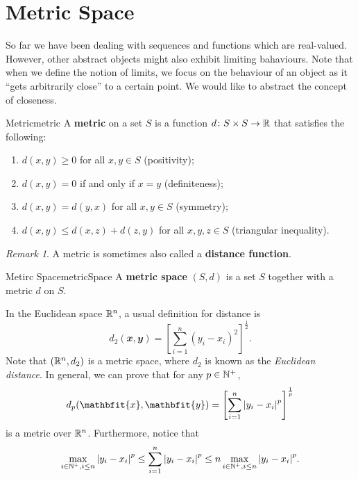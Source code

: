 \documentclass[math]{amznotes}
\theoremstyle{remark}
\newtheorem*{remark}{Remark}
\begin{document}
\section{Metric Space}
So far we have been dealing with sequences and functions which are real-valued. However, other abstract objects might also exhibit limiting bahaviours. Note that when we define the notion of limits, we focus on the behaviour of an object as it ``gets arbitrarily close'' to a certain point. We would like to abstract the concept of closeness.
\begin{dfnbox}{Metric}{metric}
    A {\color{red} \textbf{metric}} on a set $S$ is a function $d \colon S \times S \to \mathbb{R}$ that satisfies the following:
    \begin{enumerate}
        \item $d(x, y) \geq 0$ for all $x, y \in S$ (positivity);
        \item $d(x, y) = 0$ if and only if $x = y$ (definiteness);
        \item $d(x, y) = d(y, x)$ for all $x, y \in S$ (symmetry);
        \item $d(x, y) \leq d(x, z) + d(z, y)$ for all $x, y, z \in S$ (triangular inequality).
    \end{enumerate}
\end{dfnbox}
\begin{notebox}
    \begin{remark}
        A metric is sometimes also called a {\color{red} \textbf{distance function}}.
    \end{remark}
\end{notebox}
\begin{dfnbox}{Metirc Space}{metricSpace}
    A {\color{red} \textbf{metric space}} $(S, d)$ is a set $S$ together with a metric $d$ on $S$.    
\end{dfnbox}
In the Euclidean space $\mathbb{R}^n$, a usual definition for distance is
\begin{equation*}
    d_2(\mathbfit{x}, \mathbfit{y}) = \left[\sum_{i = 1}^{n}(y_i - x_i)^2\right]^{\frac{1}{2}}.
\end{equation*}
Note that $(\mathbb{R}^n, d_2)$ is a metric space, where $d_2$ is known as the \textit{Euclidean distance}. In general, we can prove that for any $p \in \mathbb{N}^+$,
\begin{equation*}
    d_p(\mathbfit{x}, \mathbfit{y}) = \left[\sum_{i = 1}^{n}\abs{y_i - x_i}^p\right]^{\frac{1}{p}}
\end{equation*}
is a metric over $\mathbb{R}^n$. Furthermore, notice that
\begin{equation*}
    \max_{i \in \mathbb{N}^+, i \leq n}{\left\lvert {y_i - x_i} \right\rvert}^p \leq \sum_{i = 1}^{n}{\left\lvert {y_i - x_i} \right\rvert}^p \leq n\max_{i \in \mathbb{N}^+, i \leq n}{\left\lvert {y_i - x_i} \right\rvert}^p.
\end{equation*}
\end{document}
